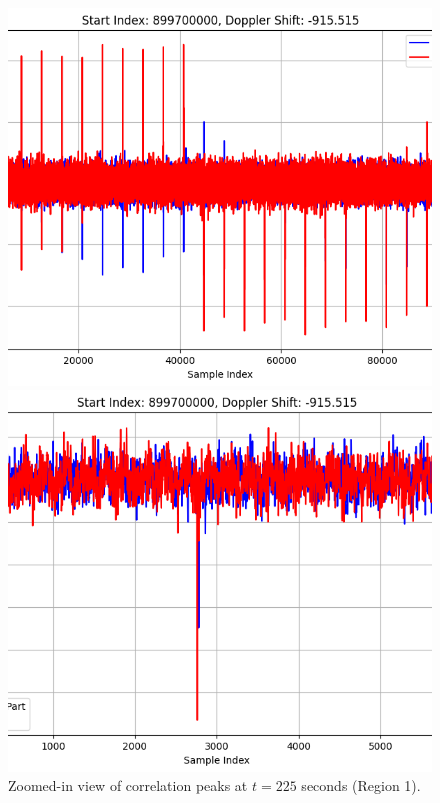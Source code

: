 \documentclass[12pt]{report}
\begin{document}
\begin{figure}[H]
  \centering
  \begin{minipage}{0.32\textwidth}
    \centering
    \includegraphics[width=\textwidth]{t225_z1.png}
    \caption{Zoomed-in view of correlation peaks at $t = 225$ seconds (Region 1).}
    \label{fig:t225_z1}
  \end{minipage}
  \hfill
  \begin{minipage}{0.32\textwidth}
    \centering
    \includegraphics[width=\textwidth]{t225_z2.png}

\end{minipage}
\end{figure}
\end{document}
